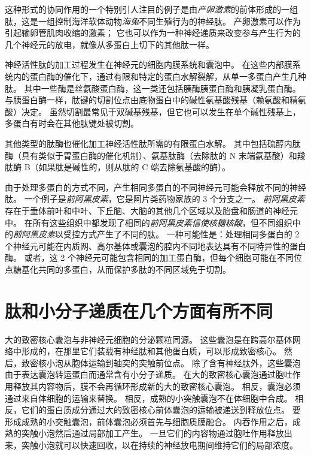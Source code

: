 这种形式的协同作用的一个特别引人注目的例子是由\textit{产卵激素}的前体形成的一组肽，这是一组控制海洋软体动物\textit{海兔}不同生殖行为的神经肽。
产卵激素可以作为引起输卵管肌肉收缩的激素；
它也可以作为一种神经递质来改变参与产生行为的几个神经元的放电，就像从多蛋白上切下的其他肽一样。


神经活性肽的加工过程发生在神经元的细胞内膜系统和囊泡中。
在这些内部膜系统内的蛋白酶的催化下，通过有限和特定的蛋白水解裂解，从单一多蛋白产生几种肽。
其中一些酶是丝氨酸蛋白酶，这一类还包括胰酶胰蛋白酶和胰凝乳蛋白酶。
与胰蛋白酶一样，肽键的切割位点由底物蛋白中的碱性氨基酸残基（赖氨酸和精氨酸）决定。
虽然切割最常见于双碱基残基，但它也可以发生在单个碱性残基上，多蛋白有时会在其他肽键处被切割。


其他类型的肽酶也催化加工神经活性肽所需的有限蛋白水解。
其中包括硫醇内肽酶（具有类似于胃蛋白酶的催化机制）、氨基肽酶（去除肽的 N 末端氨基酸）和羧肽酶 B（如果肽是碱性的，则从肽的 C 端去除氨基酸的酶）。


由于处理多蛋白的方式不同，产生相同多蛋白的不同神经元可能会释放不同的神经肽。
一个例子是\textit{前阿黑皮素}，它是阿片类药物家族的 3 个分支之一。
\textit{前阿黑皮素}存在于垂体前叶和中叶、下丘脑、大脑的其他几个区域以及胎盘和肠道的神经元中。
在所有这些组织中都发现了相同的\textit{前阿黑皮素}\textit{信使核糖核酸}，但不同组织中的\textit{前阿黑皮素}以受控方式产生了不同的肽。
一种可能性是：处理相同多蛋白的 2 个神经元可能在内质网、高尔基体或囊泡的腔内不同地表达具有不同特异性的蛋白酶。
或者，这 2 个神经元可能包含相同的加工蛋白酶，但每个细胞可能在不同位点糖基化共同的多蛋白，从而保护多肽的不同区域免于切割。



\section{肽和小分子递质在几个方面有所不同}

大的致密核心囊泡与非神经元细胞的分泌颗粒同源。
这些囊泡是在跨高尔基体网络中形成的，在那里它们装载有神经肽和其他蛋白质，可以形成致密核心。
然后，致密核小泡从胞体运输到轴突的突触前位点。
除了含有神经肽外，这些囊泡由于表达囊泡转运蛋白而通常含有小分子递质。
在大的致密核心囊泡通过胞吐作用释放其内容物后，膜不会再循环形成新的大的致密核心囊泡。
相反，囊泡必须通过来自体细胞的运输来替换。
相反，成熟的小突触囊泡不在体细胞中合成。
相反，它们的蛋白质成分通过大的致密核心前体囊泡的运输被递送到释放位点。
要形成成熟的小突触囊泡，前体囊泡必须首先与细胞质膜融合。
内吞作用之后，成熟的突触小泡然后通过局部加工产生。 
一旦它们的内容物通过胞吐作用释放出来，突触小泡就可以快速回收，以在持续的神经放电期间维持它们的局部浓度。


